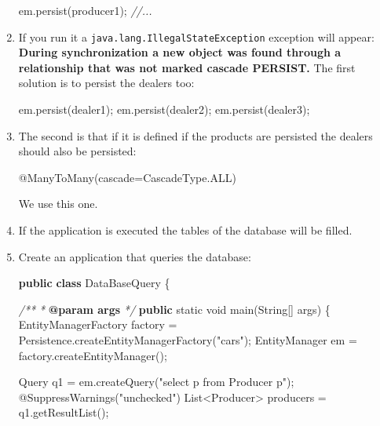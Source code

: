 \documentclass[]{report}
\newenvironment{Shaded}{}{}
\newcommand{\KeywordTok}[1]{\textcolor[rgb]{0.00,0.44,0.13}{\textbf{{#1}}}}
\newcommand{\DataTypeTok}[1]{\textcolor[rgb]{0.56,0.13,0.00}{{#1}}}
\newcommand{\StringTok}[1]{\textcolor[rgb]{0.25,0.44,0.63}{{#1}}}
\newcommand{\CommentTok}[1]{\textcolor[rgb]{0.38,0.63,0.69}{\textit{{#1}}}}
\newcommand{\FunctionTok}[1]{\textcolor[rgb]{0.02,0.16,0.49}{{#1}}}
\newcommand{\NormalTok}[1]{{#1}}
\begin{document}
\begin{enumerate}
\begin{Shaded}
\begin{Highlighting}[]
\NormalTok{em.}\FunctionTok{persist}\NormalTok{(producer1);}
\CommentTok{//...}
\end{Highlighting}
\end{Shaded}
\item
  If you run it a \texttt{java.lang.IllegalStateException} exception
  will appear: \textbf{During synchronization a new object was found
  through a relationship that was not marked cascade PERSIST.} The first
  solution is to persist the dealers too:

\begin{Shaded}
\begin{Highlighting}[]
\NormalTok{em.}\FunctionTok{persist}\NormalTok{(dealer1);}
\NormalTok{em.}\FunctionTok{persist}\NormalTok{(dealer2);}
\NormalTok{em.}\FunctionTok{persist}\NormalTok{(dealer3);}
\end{Highlighting}
\end{Shaded}
\item
  The second is that if it is defined if the products are persisted the
  dealers should also be persisted:

\begin{Shaded}
\begin{Highlighting}[]
\FunctionTok{@ManyToMany}\NormalTok{(cascade=CascadeType.}\FunctionTok{ALL}\NormalTok{)}
\end{Highlighting}
\end{Shaded}

  We use this one.
\item
  If the application is executed the tables of the database will be
  filled.
\item
  Create an application that queries the database:

\begin{Shaded}
\begin{Highlighting}[]
\KeywordTok{public} \KeywordTok{class} \NormalTok{DataBaseQuery \{}

    \CommentTok{/**}
\CommentTok{     * }\KeywordTok{@param args}
\CommentTok{     */}
    \KeywordTok{public} \DataTypeTok{static} \DataTypeTok{void} \FunctionTok{main}\NormalTok{(String[] args) \{}
        \NormalTok{EntityManagerFactory factory = Persistence.}\FunctionTok{createEntityManagerFactory}\NormalTok{(}\StringTok{"cars"}\NormalTok{);}
        \NormalTok{EntityManager em = factory.}\FunctionTok{createEntityManager}\NormalTok{();}

        \NormalTok{Query q1 = em.}\FunctionTok{createQuery}\NormalTok{(}\StringTok{"select p from Producer p"}\NormalTok{);}
        \FunctionTok{@SuppressWarnings}\NormalTok{(}\StringTok{"unchecked"}\NormalTok{)}
        \NormalTok{List<Producer> producers = q1.}\FunctionTok{getResultList}\NormalTok{();}


\end{Highlighting}
\end{Shaded}
\end{enumerate}
\end{document}
